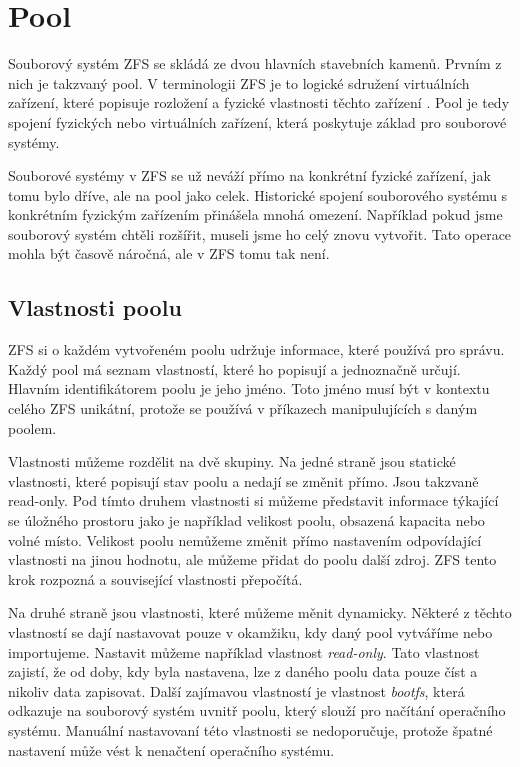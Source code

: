 \section{Pool}
Souborový systém ZFS se skládá ze dvou hlavních stavebních kamenů. Prvním z nich je takzvaný pool. V terminologii ZFS je to logické sdružení virtuálních zařízení, které popisuje rozložení a fyzické vlastnosti těchto zařízení \cite{terminology}. Pool je tedy spojení fyzických nebo virtuálních zařízení, která poskytuje základ pro souborové systémy.

Souborové systémy v ZFS se už neváží přímo na konkrétní fyzické zařízení, jak tomu bylo dříve, ale na pool jako celek. Historické spojení souborového systému s konkrétním fyzickým zařízením přinášela mnohá omezení. Například pokud jsme souborový systém chtěli rozšířit, museli jsme ho celý znovu vytvořit. Tato operace mohla být časově náročná, ale
v ZFS tomu tak není.
\subsection{Vlastnosti poolu}
ZFS si o každém vytvořeném poolu udržuje informace, které používá pro správu. Každý pool má seznam vlastností, které ho popisují a jednoznačně určují.
Hlavním identifikátorem poolu je jeho jméno. Toto jméno musí být v kontextu celého ZFS unikátní, protože se používá v příkazech manipulujících s daným poolem.

Vlastnosti můžeme rozdělit na dvě skupiny. Na jedné straně jsou statické vlastnosti, které popisují stav poolu a nedají se změnit přímo. Jsou takzvaně read-only. Pod tímto druhem vlastnosti si můžeme představit informace týkající se úložného prostoru jako je například velikost poolu, obsazená kapacita nebo volné místo. Velikost poolu nemůžeme změnit přímo nastavením odpovídající vlastnosti na jinou hodnotu, ale můžeme přidat do poolu další zdroj. ZFS tento krok rozpozná a související vlastnosti přepočítá.

Na druhé straně jsou vlastnosti, které můžeme měnit dynamicky. Některé z těchto vlastností se dají nastavovat pouze v okamžiku, kdy daný pool vytváříme nebo importujeme. Nastavit můžeme například vlastnost \emph{read-only}. Tato vlastnost zajistí, že od doby, kdy byla nastavena, lze z daného poolu data pouze číst a nikoliv data zapisovat. Další zajímavou vlastností je vlastnost \emph{bootfs}, která odkazuje na souborový systém uvnitř poolu, který slouží pro načítání operačního systému. Manuální nastavovaní této vlastnosti se nedoporučuje, protože špatné nastavení může vést k nenačtení operačního systému.

